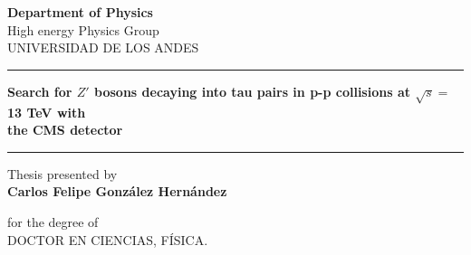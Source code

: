 \oddsidemargin 0.4cm \evensidemargin 0.4cm \topmargin 1.0cm
\textwidth 15.7cm \textheight 21.0cm \headsep 1.2cm \footskip 1.0cm

\begin{center}
\textbf{Department of Physics}\\
 High energy Physics Group\\
 \large{UNIVERSIDAD DE LOS ANDES}
\end{center}

\vspace{1.0cm}

\begin{figure}[ht]
\begin{center}
\end{center}
\end{figure}

\vspace{1.0em}

\begin{center} 
\rule{\linewidth}{0.5 mm}
\LARGE{\textbf{Search for $Z'$ bosons decaying into tau pairs in 
p-p collisions at $\sqrt{s}=$13 TeV with\\ the CMS detector}}\\
\rule{\linewidth}{0.5 mm} 
\end{center}

\vspace{1.5em}
\begin{center}
\small Thesis presented by\\
\Large \textbf{Carlos Felipe Gonz\'{a}lez Hern\'{a}ndez}
\end{center}

\vspace{1.0em}
\begin{center}
for the degree of\\
DOCTOR EN CIENCIAS, FÍSICA.
\vspace{1.5em}
\end{center}

